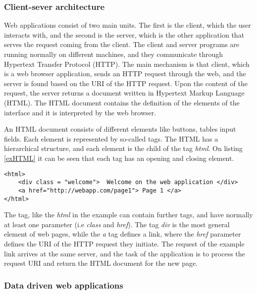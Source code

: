 \subsubsection{Client-sever architecture} \label{clientServer}

Web applications consist of two main units. The first is the client, which the user interacts with, and the second is the server, which is the other application that serves the request coming from the client. The client and server programs are running normally on different machines, and they communicate through Hypertext Transfer Protocol (HTTP). The main mechanism is that client, which is a web browser application, sends an HTTP request through the web, and the server is found based on the URI of the HTTP request. Upon the content of the request, the server returns a document written in Hypertext Markup Language (HTML). The HTML document contains the definition of the elements of the interface and it is interpreted by the web browser.


An HTML document consists of different elements like buttons, tables input fields. Each element is represented by so-called tags. The HTML has a hierarchical structure, and each element is the child of the tag \textit{html}. On listing \ref{exHTML} it can be seen that each tag has an opening and closing element.

\begin{lstlisting}[captionpos=b, caption=Example HTML document, label=exHTML, belowskip=1em, aboveskip=2em,
basicstyle=\footnotesize,frame=single]
<html>
	<div class = "welcome">  Welcome on the web application </div>
	<a href="http://webapp.com/page1"> Page 1 </a>
</html>
\end{lstlisting}

The tag, like the \textit{html} in the example can contain further tags, and have normally at least one parameter (i.e \textit{class} and \textit{href}). The tag \textit{div} is the most general element of web pages, while the \textit{a} tag defines a link, where the \textit{href} parameter defines the URI of the HTTP request they initiate. The request of the example link arrives at the same server, and the task of the application is to process the request URI and return the HTML document for the new page. 


\subsubsection{Data driven web applications} \label{dataDriven}

